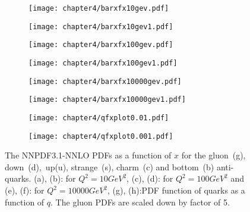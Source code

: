 \documentclass[a4paper,12pt]{report}
\numberwithin{equation}{section}
\begin{document}
\begin{figure}[H]
\centering
\begin{subfigure}{0.45\textwidth}
\texttt{[image: chapter4/barxfx10gev.pdf]}
\vspace*{-8mm}
\caption{}
\end{subfigure}
\begin{subfigure}{0.45\textwidth}
\texttt{[image: chapter4/barxfx10gev1.pdf]}
\vspace*{-8mm}
\caption{}
\end{subfigure}
\begin{subfigure}{0.45\textwidth}
\texttt{[image: chapter4/barxfx100gev.pdf]}
\vspace*{-8mm}
\caption{}
\end{subfigure}
\begin{subfigure}{0.45\textwidth}
\texttt{[image: chapter4/barxfx100gev1.pdf]}
\vspace*{-8mm}
\caption{}
\end{subfigure}
\begin{subfigure}{0.45\textwidth}
\texttt{[image: chapter4/barxfx10000gev.pdf]}
\vspace*{-8mm}
\caption{}
\end{subfigure}
\begin{subfigure}{0.45\textwidth}
\texttt{[image: chapter4/barxfx10000gev1.pdf]}
\vspace*{-8mm}
\caption{}
\end{subfigure}
\begin{subfigure}{0.45\textwidth}
\texttt{[image: chapter4/qfxplot0.01.pdf]}
\vspace*{-8mm}
\caption{}
\end{subfigure}
\begin{subfigure}{0.45\textwidth}
\texttt{[image: chapter4/qfxplot0.001.pdf]}
\vspace*{-8mm}
\caption{}
\end{subfigure}
\caption{The NNPDF3.1-NNLO PDFs as a function of $x$ for the gluon~(g), down~(d),~up(u), strange~(s), charm~(c) and bottom~(b) anti-quarks.  (a), (b): for $Q^{2}= 10GeV^{2}$, (c), (d): for $Q^{2}=100GeV^{2}$ and (e), (f): for $Q^{2}=10000GeV^{2}$, (g), (h):PDF function of quarks as a function of $q$. The gluon PDFs are scaled down by factor of 5.} 
\end{figure}  
\end{document}
